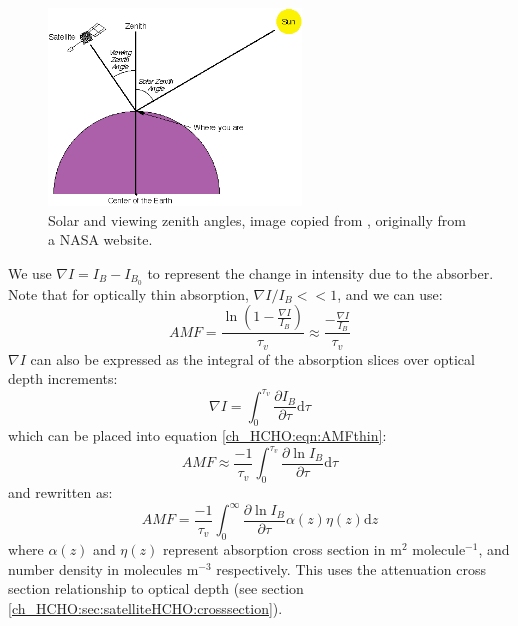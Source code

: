     \begin{figure}[!htbp]\begin{center}
      \includegraphics[width=0.6\textwidth]{Figures/ZenithAngles.png}
      \caption{Solar and viewing zenith angles, image copied from \citet{SZA_Image}, originally from a NASA website.}
      \label{ch_HCHO:fig:zenithangle}
    \end{center}\end{figure}

    We use $\nabla I = I_B - I_{B_0}$ to represent the change in intensity due to the absorber. Note that for optically thin absorption, $\nabla I / I_B << 1$, and we can use:
    \begin{equation} \label{ch_HCHO:eqn:AMFthin}
      AMF = \frac{\ln{ \left( 1 - \frac{\nabla I}{I_B} \right)} }{\tau_v} \approx \frac{ - \frac{\nabla I}{I_B} }{\tau_v}
    \end{equation}
    $\nabla I$ can also be expressed as the integral of the absorption slices over optical depth increments: 
    \begin{equation*}
      \nabla I = \int_0^{\tau_v}{\frac{\partial I_B}{\partial \tau} \mathrm{d}\tau}
    \end{equation*}
    which can be placed into equation \ref{ch_HCHO:eqn:AMFthin}:
    \begin{equation*}
      AMF \approx \frac{-1}{\tau_v} \int_0^{\tau_v}{\frac{\partial \ln{I_B}}{\partial \tau} \mathrm{d}\tau}
    \end{equation*}
    and rewritten as:
    \begin{equation} \label{ch_HCHO:eqn:AMFcross}
      AMF = \frac{-1}{\tau_v} \int_0^\infty {\frac{\partial \ln{I_B}}{\partial \tau} \alpha(z)\eta(z)\mathrm{d}z}
    \end{equation}
    where $\alpha(z)$ and $\eta(z)$ represent absorption cross section in m$^2$ molecule$^{-1}$, and number density in molecules m$^{-3}$ respectively. This uses the attenuation cross section relationship to optical depth (see section \ref{ch_HCHO:sec:satelliteHCHO:crosssection}).


